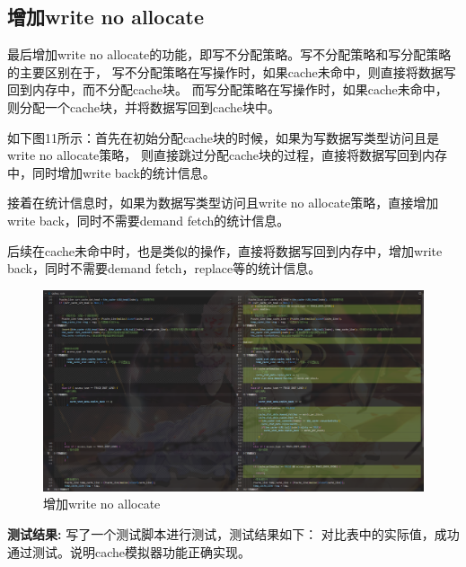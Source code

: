 \documentclass[12pt,hyperref,a4paper,UTF8]{ctexart}
\begin{document}
\subsection*{增加write no allocate}


最后增加write no allocate的功能，即写不分配策略。写不分配策略和写分配策略的主要区别在于，
写不分配策略在写操作时，如果cache未命中，则直接将数据写回到内存中，而不分配cache块。
而写分配策略在写操作时，如果cache未命中，则分配一个cache块，并将数据写回到cache块中。


如下图11所示：首先在初始分配cache块的时候，如果为写数据写类型访问且是write no allocate策略，
则直接跳过分配cache块的过程，直接将数据写回到内存中，同时增加write back的统计信息。

接着在统计信息时，如果为数据写类型访问且write no allocate策略，直接增加write back，同时不需要demand fetch的统计信息。

后续在cache未命中时，也是类似的操作，直接将数据写回到内存中，增加write back，同时不需要demand fetch，replace等的统计信息。
\begin{figure}[H]
    \centering
    \includegraphics[width=1\textwidth]{./figures/fig/image11.png}
    \caption{增加write no allocate}
\end{figure}

\textbf{测试结果:}
写了一个测试脚本进行测试，测试结果如下：
对比表中的实际值，成功通过测试。说明cache模拟器功能正确实现。
\end{document}
